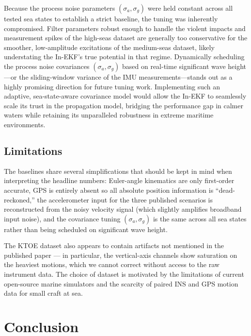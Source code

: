 \documentclass[conference]{IEEEtran}
\begin{document}
Because the process noise parameters $(\sigma_a, \sigma_g)$ were held constant across all tested sea states to establish a strict baseline, the tuning was inherently compromised. Filter parameters robust enough to handle the violent impacts and measurement spikes of the high-seas dataset are generally too conservative for the smoother, low-amplitude excitations of the medium-seas dataset, likely understating the In-EKF's true potential in that regime. Dynamically scheduling the process noise covariances $(\sigma_a, \sigma_g)$ based on real-time significant wave height---or the sliding-window variance of the IMU measurements---stands out as a highly promising direction for future tuning work. Implementing such an adaptive, sea-state-aware covariance model would allow the In-EKF to seamlessly scale its trust in the propagation model, bridging the performance gap in calmer waters while retaining its unparalleled robustness in extreme maritime environments.

\subsection{Limitations}
The baselines share several simplifications that should be kept in mind when interpreting the headline numbers: Euler-angle kinematics are only first-order accurate, GPS is entirely absent so all absolute position information is ``dead-reckoned,'' the accelerometer input for the three published scenarios is reconstructed from the noisy velocity signal (which slightly amplifies broadband input noise), and the covariance tuning $(\sigma_a, \sigma_g)$ is the same across all sea states rather than being scheduled on significant wave height.

The KTOE dataset also appears to contain artifacts not mentioned in the published paper --- in particular, the vertical-axis channels show saturation on the heaviest motions, which we cannot correct without access to the raw instrument data. The choice of dataset is motivated by the limitations of current open-source marine simulators and the scarcity of paired INS and GPS motion data for small craft at sea.

\section{Conclusion}
\label{sec:conclusion}
\end{document}
